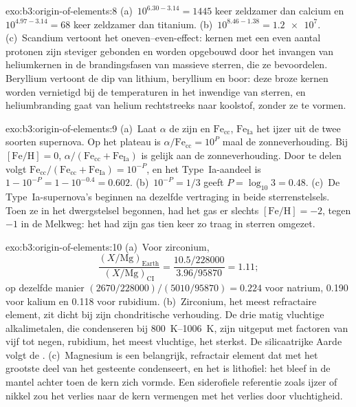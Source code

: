\begin{solution}{exo:b3:origin-of-elements:8}
(a)~$10^{6.30 - 3.14} = 1445$ keer zeldzamer dan calcium en
$10^{4.97 - 3.14} = 68$ keer zeldzamer dan titanium. (b)~$10^{8.46 - 1.38}
= \num{1.2e7}$. (c)~Scandium vertoont het oneven--even-effect: kernen met
een even aantal protonen zijn steviger gebonden en worden opgebouwd door het
invangen van heliumkernen in de brandingsfasen van massieve sterren, die
ze bevoordelen. Beryllium vertoont de dip van lithium, beryllium en boor:
deze broze kernen worden vernietigd bij de temperaturen in het inwendige van
sterren, en heliumbranding gaat van helium rechtstreeks naar koolstof,
zonder ze te vormen.
\end{solution}

\begin{solution}{exo:b3:origin-of-elements:9}
(a)~Laat $\alpha$ de  zijn en $\mathrm{Fe}_\mathrm{cc}$,
$\mathrm{Fe}_\mathrm{Ia}$ het ijzer uit de twee soorten supernova. Op
het plateau is $\alpha/\mathrm{Fe}_\mathrm{cc} = 10^{P}$ maal
de zonneverhouding. Bij $[\mathrm{Fe/H}] = 0$, $\alpha/(\mathrm{Fe}_\mathrm{cc} +
\mathrm{Fe}_\mathrm{Ia})$ is gelijk aan de zonneverhouding. Door te delen volgt
$\mathrm{Fe}_\mathrm{cc}/(\mathrm{Fe}_\mathrm{cc} + \mathrm{Fe}_\mathrm{Ia})
= 10^{-P}$, en het Type~Ia-aandeel is $1 - 10^{-P} = 1 - 10^{-0.4} =
\num{0.602}$. (b)~$10^{-P} = 1/3$ geeft $P = \log_{10}3 = 0.48$.
(c)~De Type~Ia-supernova's beginnen na dezelfde vertraging in beide sterrenstelsels.
Toen ze in het dwergstelsel begonnen, had het gas er slechts
$[\mathrm{Fe/H}] = -2$, tegen $-1$ in de Melkweg: het had zijn gas
tien keer zo traag in sterren omgezet.
\end{solution}

\begin{solution}{exo:b3:origin-of-elements:10}
(a)~Voor zirconium,
\[
\frac{(X/\mathrm{Mg})_\mathrm{Earth}}{(X/\mathrm{Mg})_\mathrm{CI}} =
\frac{10.5/228000}{3.96/95870} = 1.11 ;
\]
op dezelfde manier $(2670/228000)/(5010/95870) = 0.224$ voor natrium,
\num{0.190} voor kalium en \num{0.118} voor rubidium. (b)~Zirconium, het meest refractaire element, zit
dicht bij zijn chondritische verhouding. De drie matig vluchtige
alkalimetalen, die condenseren bij \qtyrange{800}{1006}{K}, zijn uitgeput
met factoren van vijf tot negen, rubidium, het meest vluchtige, het sterkst. De
silicaatrijke Aarde volgt de . (c)~Magnesium is een belangrijk,
refractair element dat met het grootste deel van het gesteente condenseert, en het is
lithofiel: het bleef in de mantel achter toen de kern zich vormde. Een siderofiele
referentie zoals ijzer of nikkel zou het verlies naar de kern vermengen met het
verlies door vluchtigheid.
\end{solution}

